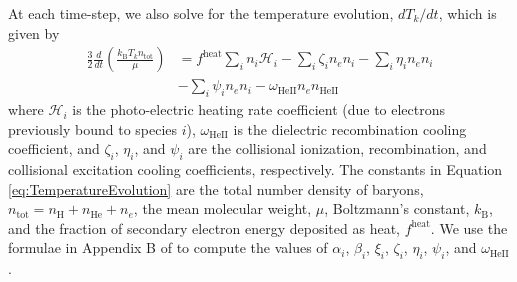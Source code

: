 \documentclass[letterpaper,titlepage,12pt]{article}
\numberwithin{equation}{section}
\newcommand{\HeII}{\text{HeII}}
\newcommand{\nHeII}{n_{\text{HeII}}}
\newcommand{\ntot}{n_{\text{tot}}}
\newcommand{\kB}{k_{\text{B}}}
\newcommand{\fheat}{f^{\text{heat}}}
\newcommand{\Heat}{\mathcal{H}}
\begin{document}
At each time-step, we also solve for the temperature evolution, $dT_k/dt$,
which
is given by
\begin{align}
    \frac{3}{2}\frac{d}{dt}\left(\frac{\kB T_k \ntot}{\mu}\right) & = \fheat  \sum_i n_i \Heat_i - \sum_i \zeta_i n_e n_i - \sum_i \eta_i n_e n_i \nonumber \\ & - \sum_i \psi_i n_e n_i - \omega_{\HeII} n_e \nHeII \label{eq:TemperatureEvolution} 
\end{align}
where $\Heat_i$ is the photo-electric heating rate coefficient (due to
electrons previously bound to species $i$), $\omega_{\HeII}$ is the dielectric
recombination cooling coefficient, and $\zeta_i$, $\eta_i$, and $\psi_i$ are
the collisional ionization, recombination, and collisional excitation cooling
coefficients, respectively. The constants in Equation
\ref{eq:TemperatureEvolution} are the total number density of baryons, $\ntot
= n_\mathrm{H} + n_{\mathrm{He}} + n_e$, the mean molecular weight, $\mu$,
Boltzmann's constant, $\kB$, and the fraction of secondary electron energy
deposited as heat, $\fheat$. We use the formulae in Appendix B of
\citet{Fukugita1994} to compute the values of $\alpha_i$, $\beta_i$, $\xi_i$,
$\zeta_i$, $\eta_i$, $\psi_i$, and $\omega_{\HeII}$.

\end{document}
